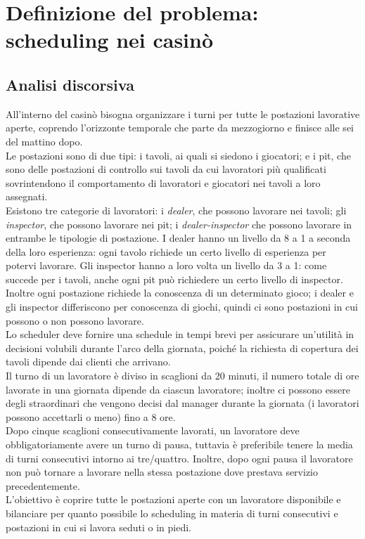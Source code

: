 \section{Definizione del problema: scheduling nei casinò}
\subsection{Analisi discorsiva}
All'interno del casinò bisogna organizzare i turni per tutte le postazioni lavorative aperte, coprendo l'orizzonte temporale che parte da mezzogiorno e finisce alle sei del mattino dopo. \\
Le postazioni sono di due tipi: i tavoli, ai quali si siedono i giocatori; e i pit, che sono delle postazioni di controllo sui tavoli da cui lavoratori più qualificati sovrintendono il comportamento di lavoratori e giocatori nei tavoli a loro assegnati. \\Esistono tre categorie di lavoratori: i \textit{dealer}, che possono lavorare nei tavoli; gli \textit{inspector}, che possono lavorare nei pit; i \textit{dealer-inspector} che possono lavorare in entrambe le tipologie di postazione. I dealer hanno un livello da 8 a 1 a seconda della loro esperienza: ogni tavolo richiede un certo livello di esperienza per potervi lavorare. Gli inspector hanno a loro volta un livello da 3 a 1: come succede per i tavoli, anche ogni pit può richiedere un certo livello di inspector.
Inoltre ogni postazione richiede la conoscenza di un determinato gioco; i dealer e gli inspector differiscono per conoscenza di giochi, quindi ci sono postazioni in cui possono o non possono lavorare.\\
Lo scheduler deve fornire una schedule in tempi brevi per assicurare un'utilità in decisioni volubili durante l'arco della giornata, poiché la richiesta di copertura dei tavoli dipende dai clienti che arrivano. \\Il turno di un lavoratore è diviso in scaglioni da 20 minuti, il numero totale di ore lavorate in una giornata dipende da ciascun lavoratore; inoltre ci possono essere degli straordinari che vengono decisi dal manager durante la giornata (i lavoratori possono accettarli o meno) fino a 8 ore.\\
Dopo cinque scaglioni consecutivamente lavorati, un lavoratore deve obbligatoriamente avere un turno di pausa, tuttavia è preferibile tenere la media di turni consecutivi intorno ai tre/quattro. Inoltre, dopo ogni pausa il lavoratore non può tornare a lavorare nella stessa postazione dove prestava servizio precedentemente.\\ L'obiettivo è coprire tutte le postazioni aperte con un lavoratore disponibile e bilanciare per quanto possibile lo scheduling in materia di turni consecutivi e postazioni in cui si lavora seduti o in piedi.

